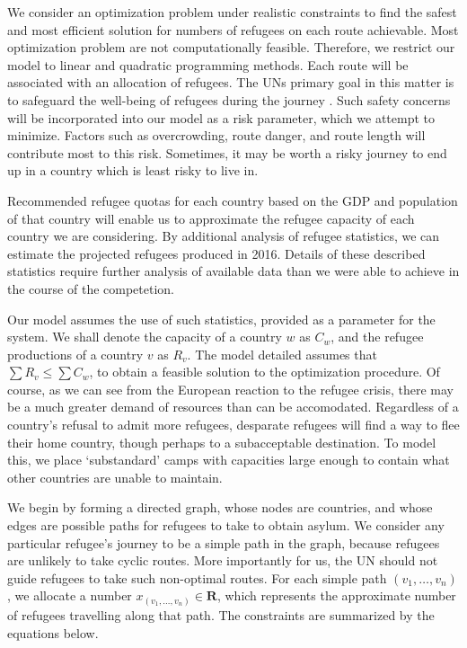 \documentclass{article}
\begin{document}
We consider an optimization problem under realistic constraints to find the safest and most efficient solution for numbers of refugees on each route achievable. Most optimization problem are not computationally feasible. Therefore, we restrict our model to linear and quadratic programming methods. Each route will be associated with an allocation of refugees. The UNs primary goal in this matter is to safeguard the well-being of refugees during the journey \cite{UNStatement}. Such safety concerns will be incorporated into our model as a risk parameter, which we attempt to minimize. Factors such as overcrowding, route danger, and route length will contribute most to this risk. Sometimes, it may be worth a risky journey to end up in a country which is least risky to live in.

Recommended refugee quotas for each country based on the GDP and population of that country will enable us to approximate the refugee capacity of each country we are considering. By additional analysis of refugee statistics, we can estimate the projected refugees produced in 2016. Details of these described statistics require further analysis of available data than we were able to achieve in the course of the competetion.

Our model assumes the use of such statistics, provided as a parameter for the system. We shall denote the capacity of a country $w$ as $C_w$, and the refugee productions of a country $v$ as $R_v$. The model detailed assumes that $\sum R_v \leq \sum C_w$, to obtain a feasible solution to the optimization procedure. Of course, as we can see from the European reaction to the refugee crisis, there may be a much greater demand of resources than can be accomodated. Regardless of a country's refusal to admit more refugees, desparate refugees will find a way to flee their home country, though perhaps to a subacceptable destination. To model this, we place `substandard' camps with capacities large enough to contain what other countries are unable to maintain.

We begin by forming a directed graph, whose nodes are countries, and whose edges are possible paths for refugees to take to obtain asylum. We consider any particular refugee's journey to be a simple path in the graph, because refugees are unlikely to take cyclic routes. More importantly for us, the UN should not guide refugees to take such non-optimal routes. For each simple path $(v_1, \dots, v_n)$, we allocate a number $x_{(v_1, \dots, v_n)} \in \mathbf{R}$, which represents the approximate number of refugees travelling along that path. The constraints are summarized by the equations below.
\end{document}
